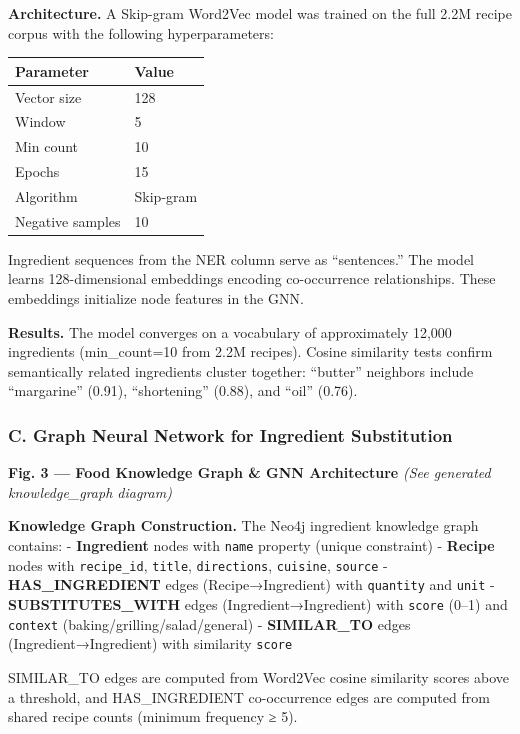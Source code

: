 \documentclass[10pt,conference,compsoc]{IEEEtran}
\begin{document}
\textbf{Architecture.} A Skip-gram Word2Vec model was trained on the
full 2.2M recipe corpus with the following hyperparameters:

\begin{longtable}[]{@{}ll@{}}
\toprule\noalign{}
Parameter & Value \\
\midrule\noalign{}
\endhead
\bottomrule\noalign{}
\endlastfoot
Vector size & 128 \\
Window & 5 \\
Min count & 10 \\
Epochs & 15 \\
Algorithm & Skip-gram \\
Negative samples & 10 \\
\end{longtable}

Ingredient sequences from the NER column serve as ``sentences.'' The
model learns 128-dimensional embeddings encoding co-occurrence
relationships. These embeddings initialize node features in the GNN.

\textbf{Results.} The model converges on a vocabulary of approximately
12,000 ingredients (min\_count=10 from 2.2M recipes). Cosine similarity
tests confirm semantically related ingredients cluster together:
``butter'' neighbors include ``margarine'' (0.91), ``shortening''
(0.88), and ``oil'' (0.76).

\subsubsection{C. Graph Neural Network for Ingredient
Substitution}\label{c.-graph-neural-network-for-ingredient-substitution}

\textbf{Fig. 3 --- Food Knowledge Graph \& GNN Architecture} \emph{(See
generated knowledge\_graph diagram)}

\textbf{Knowledge Graph Construction.} The Neo4j ingredient knowledge
graph contains: - \textbf{Ingredient} nodes with \texttt{name} property
(unique constraint) - \textbf{Recipe} nodes with \texttt{recipe\_id},
\texttt{title}, \texttt{directions}, \texttt{cuisine}, \texttt{source} -
\textbf{HAS\_INGREDIENT} edges (Recipe→Ingredient) with
\texttt{quantity} and \texttt{unit} - \textbf{SUBSTITUTES\_WITH} edges
(Ingredient→Ingredient) with \texttt{score} (0--1) and \texttt{context}
(baking/grilling/salad/general) - \textbf{SIMILAR\_TO} edges
(Ingredient→Ingredient) with similarity \texttt{score}

SIMILAR\_TO edges are computed from Word2Vec cosine similarity scores
above a threshold, and HAS\_INGREDIENT co-occurrence edges are computed
from shared recipe counts (minimum frequency ≥ 5).
\end{document}
